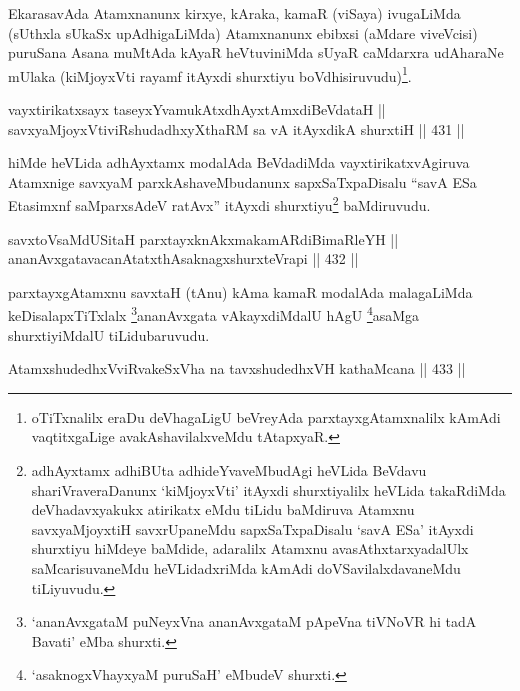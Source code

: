 \begin{artha}
EkarasavAda Atamxnanunx kirxye, kAraka, kamaR (viSaya) ivugaLiMda
(sUthxla sUkaSx upAdhigaLiMda) Atamxnanunx ebibxsi (aMdare viveVcisi)
puruSana Asana muMtAda kAyaR heVtuviniMda sUyaR caMdarxra udAharaNe
mUlaka (kiMjoyxVti rayamf itAyxdi shurxtiyu
boVdhisiruvudu)\footnote{oTiTxnalilx eraDu deVhagaLigU beVreyAda parxtayxgAtamxnalilx kAmAdi vaqtitxgaLige avakAshavilalxveMdu tAtapxyaR.}.
\end{artha}

\begin{shl}
vayxtirikatxsayx taseyxYvamukAtxdhAyxtAmxdiBeVdataH || \\
savxyaMjoyxVtiviRshudadhxyXthaRM sa vA itAyxdikA shurxtiH \hfill || 431 ||  
\end{shl}

\begin{artha}
hiMde heVLida adhAyxtamx modalAda BeVdadiMda vayxtirikatxvAgiruva
Atamxnige savxyaM parxkAshaveMbudanunx sapxSaTxpaDisalu ``savA ESa Etasimxnf saMparxsAdeV ratAvx''
itAyxdi shurxtiyu\footnote{adhAyxtamx adhiBUta adhideYvaveMbudAgi heVLida BeVdavu shariVraveraDanunx `kiMjoyxVti' itAyxdi shurxtiyalilx heVLida takaRdiMda deVhadavxyakukx atirikatx eMdu tiLidu baMdiruva Atamxnu savxyaM\break joyxtiH savxrUpaneMdu sapxSaTxpaDisalu `savA ESa' itAyxdi shurxtiyu hiMdeye baMdide, adaralilx Atamxnu avasAthxtarxyadalUlx saMcarisuvaneMdu heVLidadxriMda kAmAdi doVSavilalxdavaneMdu tiLiyuvudu.} baMdiruvudu.
\end{artha}

\begin{shl}
savxtoV\s saMdUSitaH parxtayxknAkxmakamARdiBimaRleYH || \\
ananAvxgatavacanAtatxthA\s saknagxshurxteVrapi \hfill || 432 ||  
\end{shl}

\begin{artha}
parxtayxgAtamxnu savxtaH (tAnu) kAma kamaR modalAda malagaLiMda
keDisalapxTiTxlalx \footnote{`ananAvxgataM puNeyxVna ananAvxgataM pApeVna tiVNoVR hi tadA Bavati' eMba shurxti.}ananAvxgata vAkayxdiMdalU hAgU \footnote{`asaknogxVhayxyaM puruSaH' eMbudeV shurxti.}asaMga shurxtiyiMdalU tiLidubaruvudu.
\end{artha}


\begin{shl}
AtamxshudedhxVviRvakeSxVha na tavxshudedhxVH kathaMcana \hfill || 433 ||
\end{shl}

